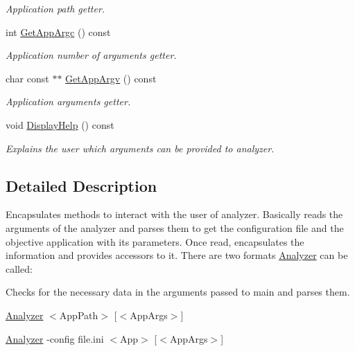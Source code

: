 \begin{DoxyCompactItemize}
\begin{DoxyCompactList}\small\item\em Application path getter. \end{DoxyCompactList}\item 
int \hyperlink{class_command_line_ac420a15eac8608dd0eacf36e8e09e913}{Get\-App\-Argc} () const 
\begin{DoxyCompactList}\small\item\em Application number of arguments getter. \end{DoxyCompactList}\item 
char const $\ast$$\ast$ \hyperlink{class_command_line_a96c4896292425152d4200ff2a6821c22}{Get\-App\-Argv} () const 
\begin{DoxyCompactList}\small\item\em Application arguments getter. \end{DoxyCompactList}\item 
\hypertarget{class_command_line_a6709a77ba7fc2d93e79526583481616b}{void \hyperlink{class_command_line_a6709a77ba7fc2d93e79526583481616b}{Display\-Help} () const }\label{class_command_line_a6709a77ba7fc2d93e79526583481616b}

\begin{DoxyCompactList}\small\item\em Explains the user which arguments can be provided to analyzer. \end{DoxyCompactList}\end{DoxyCompactItemize}


\subsection{Detailed Description}
Encapsulates methods to interact with the user of analyzer. Basically reads the arguments of the analyzer and parses them to get the configuration file and the objective application with its parameters. Once read, encapsulates the information and provides accessors to it. There are two formats \hyperlink{class_analyzer}{Analyzer} can be called\-: 

Checks for the necessary data in the arguments passed to main and parses them.


\begin{DoxyItemize}
\item \hyperlink{class_analyzer}{Analyzer} $<$\-App\-Path$>$ \mbox{[}$<$\-App\-Args$>$\mbox{]}  
\item \hyperlink{class_analyzer}{Analyzer} -\/config file.\-ini $<$\-App$>$ \mbox{[}$<$\-App\-Args$>$\mbox{]}  
\end{DoxyItemize}

